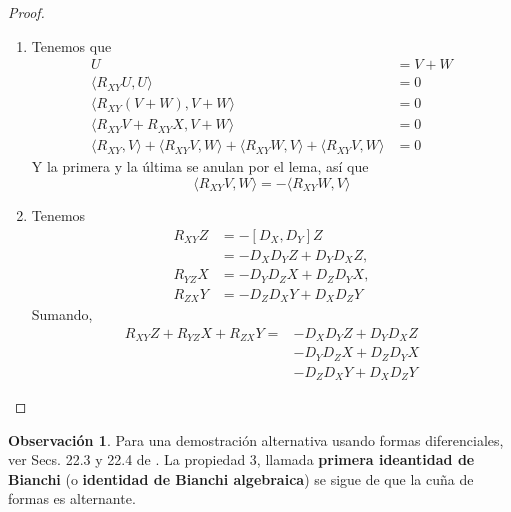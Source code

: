 \documentclass[spanish]{book}
\theoremstyle{definition}
\newtheorem*{obs}{Observación}
\begin{document}
\begin{proof}
\begin{enumerate}
\begin{proof}[Demostración del lema]
				Restando,
				\[Y\langle D_XU,U\rangle=-X\langle D_YU,U\rangle=\frac{1}{2}[Y,X]\langle U,U\rangle\]
				Pero $[X,Y]=0$, así que
				\[Y\langle D_XU,U\rangle-X\langle D_YU,U\rangle=0\]
			\end{proof}
			Ahora continuemos con nuestra demostración.
			\item Tenemos que 
			\begin{align*}
				U&=V+W\\
				\langle R_{XY}U,U\rangle&=0\\
				\langle R_{XY}(V+W),V+W\rangle&=0\\
				\langle R_{XY}V+R_{XY}X,V+W\rangle&=0\\
				\langle R_{XY},V\rangle+\langle R_{XY}V,W\rangle+\langle R_{XY}W,V\rangle+\langle R_{XY}V,W\rangle&=0
			\end{align*}
			Y la primera y la última se anulan por el lema, así que
			\[\langle R_{XY}V,W\rangle=-\langle R_{XY}W,V\rangle\]
			
			\item Tenemos
			\begin{align*}
				R_{XY}Z&=-[D_X,D_Y]Z\\
				&=-D_XD_YZ+D_YD_XZ,\\
				R_{YZ}X&=-D_YD_ZX+D_ZD_YX,\\
				R_{ZX}Y&=-D_ZD_XY+D_XD_ZY
			\end{align*}
			Sumando,
			\begin{align*}
				R_{XY}Z+R_{YZ}X+R_{ZX}Y=&-D_XD_YZ+D_YD_XZ\\
				&-D_YD_ZX+D_ZD_YX\\
				&-D_ZD_XY+D_XD_ZY
			\end{align*}
		\end{enumerate}
	\end{proof}
	
	\begin{obs}
		Para una demostración alternativa usando formas diferenciales, ver Secs. 22.3 y 22.4 de \cite{Loring-dif}. La propiedad 3, llamada \textbf{primera ideantidad de Bianchi} (o \textbf{identidad de Bianchi algebraica}) se sigue de que la cuña de formas es alternante.
	\end{obs}
	
\end{document}
